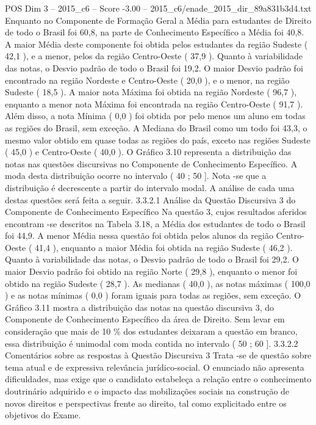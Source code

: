 \begin{textsample}{POS Dim 3 – 2015\_c6 – Score -3.00 – 2015\_c6/enade\_2015\_dir\_89a831b3d4.txt}
Enquanto no Componente de Formação Geral a Média para estudantes de Direito de todo o Brasil foi 60,8, na parte de Conhecimento Específico a Média foi 40,8.
A maior Média deste componente foi obtida pelos estudantes da região Sudeste ( 42,1 ), e a menor, pelos da região Centro-Oeste ( 37,9 ).
Quanto à variabilidade das notas, o Desvio padrão de todo o Brasil foi 19,2.
O maior Desvio padrão foi encontrado na região Nordeste e Centro-Oeste ( 20,0 ), e o menor, na região Sudeste ( 18,5 ).
A maior nota Máxima foi obtida na região Nordeste ( 96,7 ), enquanto a menor nota Máxima foi encontrada na região Centro-Oeste ( 91,7 ).
Além disso, a nota Mínima ( 0,0 ) foi obtida por pelo menos um aluno em todas as regiões do Brasil, sem exceção.
A Mediana do Brasil como um todo foi 43,3, o mesmo valor obtido em quase todas as regiões do país, exceto nas regiões Sudeste ( 45,0 ) e Centro-Oeste ( 40,0 ).
O Gráfico 3.10 representa a distribuição das notas nas questões discursivas no Componente de Conhecimento Específico.
A moda desta distribuição ocorre no intervalo ( 40 ; 50 ].
Nota -se que a distribuição é decrescente a partir do intervalo modal.
A análise de cada uma destas questões será feita a seguir. 3.3.2.1 Análise da Questão Discursiva 3 do Componente de Conhecimento Específico Na questão 3, cujos resultados aferidos encontram -se descritos na Tabela 3.18, a Média dos estudantes de todo o Brasil foi 44,9.
A menor Média nessa questão foi obtida pelos alunos da região Centro-Oeste ( 41,4 ), enquanto a maior Média foi obtida na região Sudeste ( 46,2 ).
Quanto à variabilidade das notas, o Desvio padrão de todo o Brasil foi 29,2.
O maior Desvio padrão foi obtido na região Norte ( 29,8 ), enquanto o menor foi obtido na região Sudeste ( 28,7 ).
As medianas ( 40,0 ), as notas máximas ( 100,0 ) e as notas mínimas ( 0,0 ) foram iguais para todas as regiões, sem exceção.
O Gráfico 3.11 mostra a distribuição das notas na questão discursiva 3, do Componente de Conhecimento Específico da área de Direito.
Sem levar em consideração que mais de 10 \% dos estudantes deixaram a questão em branco, essa distribuição é unimodal com moda contida no intervalo ( 50 ; 60 ]. 3.3.2.2 Comentários sobre as respostas à Questão Discursiva 3 Trata -se de questão sobre tema atual e de expressiva relevância jurídico-social.
O enunciado não apresenta dificuldades, mas exige que o candidato estabeleça a relação entre o conhecimento doutrinário adquirido e o impacto das mobilizações sociais na construção de novos direitos e perspectivas frente ao direito, tal como explicitado entre os objetivos do Exame.

\end{textsample}
